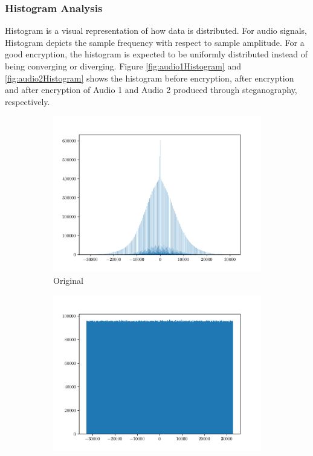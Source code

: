 \documentclass[a4paper]{cas-sc}
\begin{document}
\subsubsection{Histogram Analysis}
Histogram is a visual representation of how data is distributed. For audio signals, Histogram depicts the sample frequency with respect to sample amplitude. For a good encryption, the histogram is expected to be uniformly distributed instead of being converging or diverging. Figure \ref{fig:audio1Histogram} and \ref{fig:audio2Histogram} shows the histogram before encryption, after encryption and after encryption of Audio 1 and Audio 2 produced through steganography, respectively.
\begin{figure}[pos=h]
    \begin{subfigure}[h]{0.3\textwidth}
        \begin{center}
            \includegraphics[width=\textwidth]{embedded1Histogram.png}
            \caption{Original}
            \label{fig:embedded1Histogram}
        \end{center}
    \end{subfigure}
    \begin{subfigure}[h]{0.3\textwidth}
        \begin{center}
            \includegraphics[width=\textwidth]{encrypted1Histogram.png}

\end{center}
\end{subfigure}
\end{figure}
\end{document}
